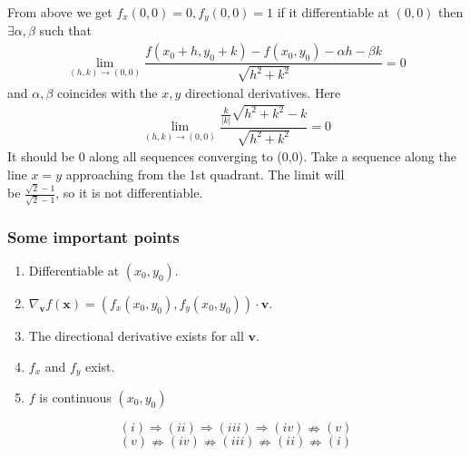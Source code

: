 \documentclass[11pt]{beamer}
\begin{document}
\begin{frame}
From above we get $f_x(0,0)=0,f_y(0,0)=1$ if it differentiable at $(0,0)$ then $\exists \alpha ,\beta$ such that
\begin{align*}
\underset{(h,k)\to(0,0)}{\lim} \dfrac{f(x_0+h,y_0+k)-f(x_0,y_0)-\alpha h-\beta k}{\sqrt{h^2+k^2}}=0
\end{align*}
and $\alpha,\beta$ coincides with the $x,y$ directional derivatives. Here
\begin{align*}
\underset{(h,k)\to(0,0)}{\lim} \dfrac{\frac{k}{|k|}\sqrt{h^2+k^2}-k}{\sqrt{h^2+k^2}}=0
\end{align*}
It should be 0 along all sequences converging to (0,0). Take a sequence along the line $x=y$ approaching from the 1st quadrant. The limit will \\be $\frac{\sqrt{2}-1}{\sqrt{2}-1}$, so it is not differentiable.
\end{frame}
\begin{frame}
\frametitle{Some important points}
\begin{enumerate}
  \item Differentiable at $(x_0,y_0)$.
  \item $\nabla_{\textbf{v}}f(\textbf{x})=(f_x(x_0,y_0),f_y(x_0,y_0))\cdot \textbf{v}$.
  \item The directional derivative exists for all $\textbf{v}$.
  \item $f_x$ and $f_y$ exist.
  \item $f$ is continuous $(x_0,y_0)$
\end{enumerate}
$$(i)\Rightarrow (ii)\Rightarrow (iii)\Rightarrow (iv)\nRightarrow (v)$$
$$(v)\nRightarrow (iv)\nRightarrow (iii)\nRightarrow (ii)\nRightarrow (i)$$
\end{frame}
\end{document}

